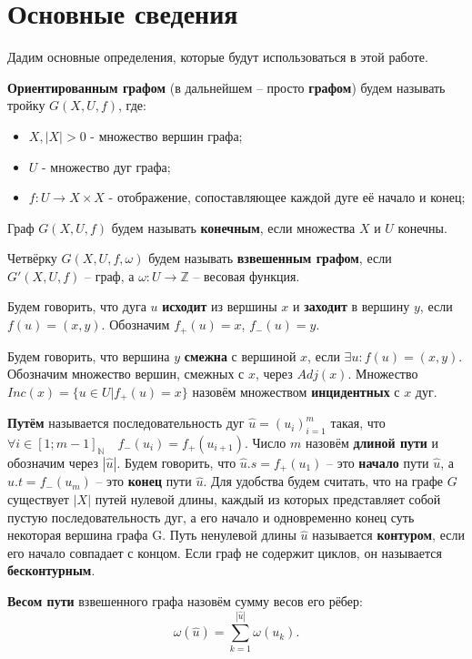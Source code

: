 \section{Основные сведения}
Дадим основные определения, которые будут использоваться в этой работе.

\begin{defn}
	\textbf{Ориентированным графом} (в дальнейшем -- просто \textbf{графом}) будем называть тройку $G (X, U, f)$, где:
	\begin{itemize}
		\item $X, |X|>0$ - множество вершин графа;
		\item $U$ - множество дуг графа;
		\item $f : U \to X\times X $ - отображение, сопоставляющее каждой дуге её начало и конец;
	\end{itemize}
\end{defn}
\begin{defn}
	Граф $G(X, U, f)$ будем называть \textbf{конечным}, если множества $X$ и $U$ конечны.
\end{defn}
\begin{defn}
	Четвёрку $G(X, U, f, \omega)$ будем называть \textbf{взвешенным графом}, если $G'(X, U, f)$ -- граф, а $\omega : U \to \mathbb{Z}$ -- весовая функция.
\end{defn}
\begin{defn}
	Будем говорить, что дуга $u$ \textbf{исходит} из вершины $x$ и \textbf{заходит} в вершину $y$, если $f(u) = (x,y)$. Обозначим $f_+(u)=x$, $f_-(u)=y$.
\end{defn} 
\begin{defn}
	Будем говорить, что вершина $y$ \textbf{смежна} с вершиной $x$, если $\exists u : f(u) = (x,y)$. Обозначим множество вершин, смежных с $x$, через $Adj(x)$. Множество $Inc(x) = \{u \in U | f_+(u) = x  \}$ назовём множеством \textbf{инцидентных} с $x$ дуг.
\end{defn} 
\begin{defn}
	\textbf{Путём} называется последовательность дуг $\widehat{u} = (u_i)_{i = 1}^m$ такая, что $\forall i\in [1;m-1]_\mathbb{N} \quad f_-(u_i) =f_+(u_{i+1})$. Число $m$ назовём \textbf{длиной пути} и обозначим через $|\widehat{u}|$. Будем говорить, что $\widehat{u}.s = f_+(u_1)$ -- это \textbf{начало} пути $\widehat{u}$, а $\widehat{u}.t = f_-(u_m)$ -- это \textbf{конец} пути $\widehat{u}$. Для удобства будем считать, что на графе $G$ существует $|X|$ путей нулевой длины, каждый из которых представляет собой пустую последовательность дуг, а его начало и одновременно конец суть некоторая вершина графа G. Путь ненулевой длины $\widehat{u}$ называется \textbf{контуром}, если его начало совпадает с концом. Если граф не содержит циклов, он называется \textbf{бесконтурным}.
\end{defn} 
\begin{defn}
	\textbf{Весом пути} взвешенного графа назовём сумму весов его рёбер: 
	\begin{equation*}
	\omega(\widehat{u}) = \sum\limits_{k=1}^{|\widehat{u}|} \omega(u_k).
	\end{equation*}
\end{defn} 

